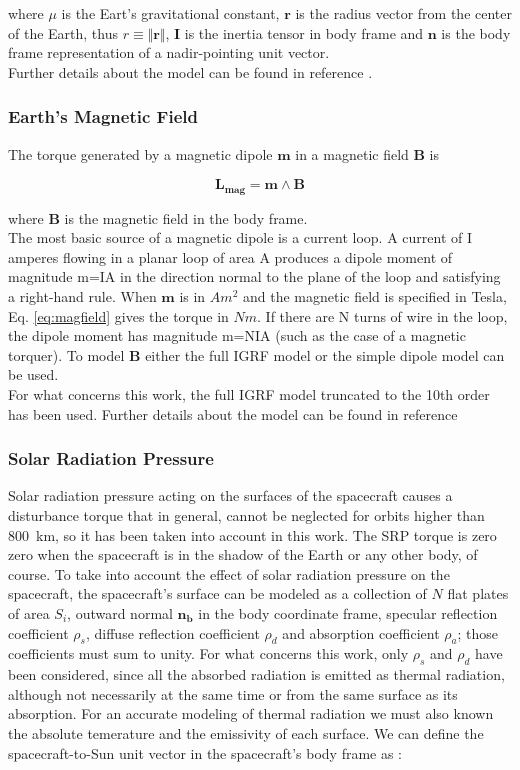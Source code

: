 \documentclass[11pt,a4paper]{report}
\begin{document}
where $\mu$ is the Eart's gravitational constant, $\textbf{r}$ is the radius vector from the center of the Earth, thus $r \equiv \Vert{\textbf{r}}\Vert$, $\textbf{I}$ is the inertia tensor in body frame and $\textbf{n}$ is the body frame representation of a nadir-pointing unit vector.\\
Further details about the model can be found in reference \cite{Ref:Books:Fundamentals}.

\subsubsection{Earth's Magnetic Field}
The torque generated by a magnetic dipole $\textbf{m}$ in a magnetic field $\textbf{B}$ is

\begin{equation}
 \mathbf{L_{mag}} = \mathbf{m} \wedge \mathbf{B}
 \label{eq:magfield}
\end{equation}

where $\mathbf{B}$ is the magnetic field in the body frame.\\
The most basic source of a magnetic dipole is a current loop. A current of I amperes flowing in a planar loop of area A produces a dipole moment of magnitude m=IA in the direction normal to the plane of the loop and satisfying a right-hand rule.
When $\textbf{m}$ is in $Am^2$ and the magnetic field is specified in Tesla, Eq. \ref{eq:magfield} gives the torque in $Nm$. If there are N turns of wire in the loop, the dipole moment has magnitude m=NIA (such as the case of a magnetic torquer).
To model $\textbf{B}$ either the full IGRF model or the simple dipole model can be used.\\
For what concerns this work, the full IGRF model truncated to the 10th order has been used. Further details about the model can be found in reference \cite{Ref:Articles:IGRF}

\subsubsection{Solar Radiation Pressure}
Solar radiation pressure acting on the surfaces of the spacecraft causes a disturbance torque that in general, cannot be neglected for orbits higher than \SI{800}{\kilo\meter}, so it has been taken into account in this work.
The SRP torque is zero zero when the spacecraft is in the shadow of the Earth or any other body, of course.
To take into account the effect of solar radiation pressure on the spacecraft, the spacecraft's surface can be modeled as a collection of $N$ flat plates of area $S_{i}$, outward normal $\mathbf{n_{b}}$ in the body coordinate frame, specular reflection coefficient $\rho_s$, diffuse reflection coefficient $\rho_{d}$ and absorption coefficient $\rho_{a}$; those coefficients must sum to unity.
For what concerns this work, only $\rho_s$ and $\rho_d$ have been considered, since all the absorbed radiation is emitted as thermal radiation,  although not necessarily at the same time or from the same surface as its absorption.
For an accurate modeling of thermal radiation we must also known the absolute temerature and the emissivity of each surface.
We can define the spacecraft-to-Sun unit vector in the spacecraft's body frame as : 
\end{document}
